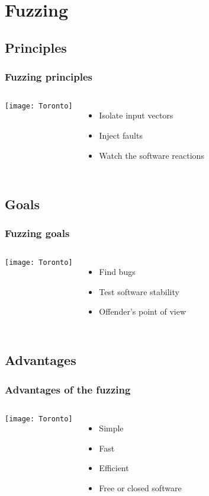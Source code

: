 \section{Fuzzing}

\subsection{Principles}
\frame
{
    \frametitle{Fuzzing principles}
    \begin{columns}[c]
        \column{2in}
            \texttt{[image: Toronto]}

        \column{2.3in}
            \begin{itemize}
            \item Isolate input vectors
            \item Inject faults
            \item Watch the software reactions
            \end{itemize}
    \end{columns}
}


\subsection{Goals}
\frame
{
    \frametitle{Fuzzing goals}
    \begin{columns}[c]
        \column{2in}
            \texttt{[image: Toronto]}

        \column{2.3in}
          \begin{itemize}
          \item Find bugs
          \item Test software stability
          \item Offender's point of view
          \end{itemize}
    \end{columns}
}

\subsection{Advantages}
\frame
{
    \frametitle{Advantages of the fuzzing}

    \begin{columns}[c]
        \column{2in}
            \texttt{[image: Toronto]}

        \column{2.3in}
            \begin{itemize}
            \item Simple
            \item Fast
            \item Efficient
            \item Free or closed software
            \end{itemize}
    \end{columns}
}

